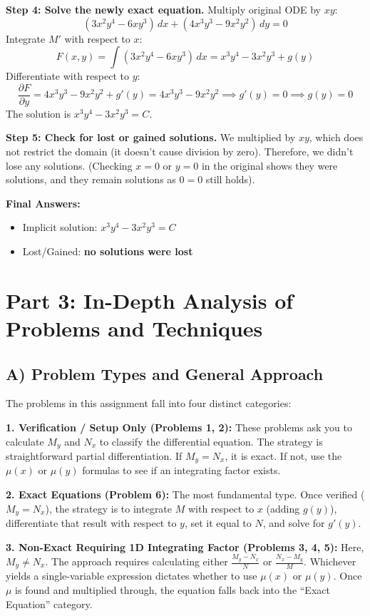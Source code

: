 \documentclass[11pt]{article}
\begin{document}
\textbf{Step 4: Solve the newly exact equation.} Multiply original ODE by $xy$:
\[ (3x^2y^4 - 6xy^3) \, dx + (4x^3y^3 - 9x^2y^2) \, dy = 0 \]
Integrate $M'$ with respect to $x$:
\[ F(x, y) = \int (3x^2y^4 - 6xy^3) \, dx = x^3y^4 - 3x^2y^3 + g(y) \]
Differentiate with respect to $y$:
\[ \frac{\partial F}{\partial y} = 4x^3y^3 - 9x^2y^2 + g'(y) = 4x^3y^3 - 9x^2y^2 \implies g'(y) = 0 \implies g(y) = 0 \]
The solution is $x^3y^4 - 3x^2y^3 = C$.

\textbf{Step 5: Check for lost or gained solutions.} We multiplied by $xy$, which does not restrict the domain (it doesn't cause division by zero). Therefore, we didn't lose any solutions. (Checking $x = 0$ or $y = 0$ in the original shows they were solutions, and they remain solutions as $0 = 0$ still holds).

\textbf{Final Answers:}
\begin{itemize}
    \item Implicit solution: $x^3y^4 - 3x^2y^3 = C$
    \item Lost/Gained: \textbf{no solutions were lost}
\end{itemize}

\newpage
\section*{Part 3: In-Depth Analysis of Problems and Techniques}

\subsection*{A) Problem Types and General Approach}
The problems in this assignment fall into four distinct categories:

\textbf{1. Verification / Setup Only (Problems 1, 2):} These problems ask you to calculate $M_y$ and $N_x$ to classify the differential equation. The strategy is straightforward partial differentiation. If $M_y = N_x$, it is exact. If not, use the $\mu(x)$ or $\mu(y)$ formulas to see if an integrating factor exists.

\textbf{2. Exact Equations (Problem 6):} The most fundamental type. Once verified ($M_y = N_x$), the strategy is to integrate $M$ with respect to $x$ (adding $g(y)$), differentiate that result with respect to $y$, set it equal to $N$, and solve for $g'(y)$.

\textbf{3. Non-Exact Requiring 1D Integrating Factor (Problems 3, 4, 5):} Here, $M_y \neq N_x$. The approach requires calculating either $\frac{M_y - N_x}{N}$ or $\frac{N_x - M_y}{M}$. Whichever yields a single-variable expression dictates whether to use $\mu(x)$ or $\mu(y)$. Once $\mu$ is found and multiplied through, the equation falls back into the ``Exact Equation'' category.
\end{document}
